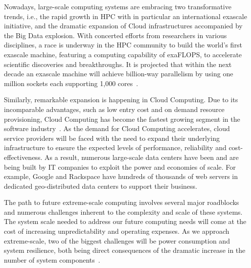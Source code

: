 Nowadays, large-scale computing systems are embracing two transformative trends, i.e., the rapid growth
in HPC with in particular an international
exascale initiative, and the dramatic expansion of Cloud infrastructures accompanied by the Big Data explosion. 
With concerted efforts from researchers in various disciplines, a race
is underway in the HPC community to build the world's first exascale machine, featuring a computing capability of exaFLOPS, 
to accelerate scientific discoveries and breakthroughs. It is 
projected that within the next decade an exascale machine will achieve billion-way parallelism by using one million sockets each supporting 
1,000 cores~\cite{doe_ascr_exascale_2011,top_ten_2014}. 

Similarly, remarkable expansion is happening in Cloud Computing.  
Due to its incomparable advantages, such as low entry cost and on demand resource provisioning, 
Cloud Computing has become the fastest growing segment in the software industry~\cite{anderson2013forecast}.
As the demand for Cloud Computing accelerates, cloud service providers  
will be faced with the need to expand their underlying infrastructure to ensure the expected levels of performance, reliability and cost-effectiveness. 
As a result, numerous large-scale data centers have been and are being built by IT companies
to exploit the power and economies of scale. 
For example, Google and Rackspace have hundreds of thousands 
of web servers in dedicated geo-distributed data centers to support their business. 

The path to future extreme-scale computing involves several major roadblocks and numerous challenges inherent 
to the complexity and scale of these systems. 
The system scale needed to address our future computing needs will come at the cost of increasing unpredictability  
and operating expenses. As we approach extreme-scale, two of the biggest challenges will be power 
consumption and system resilience, both being direct consequences of the dramatic increase in the 
number of system components~\cite{exa_challenge_2010,snir2014addressing}. 

